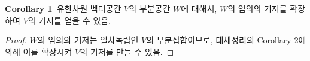 \textbf{Corollary 1}\, 유한차원 벡터공간 $V$의 부분공간 $W$에 대해서, $W$의 임의의 기저를 확장하여 $V$의 기저를 얻을 수 있음.

\begin{proof}
$W$의 임의의 기저는 일차독립인 $V$의 부분집합이므로, 대체정리의 Corollary 2에 의해 이를 확장시켜 $V$의 기저를 만들 수 있음.
\end{proof}


\newpage
